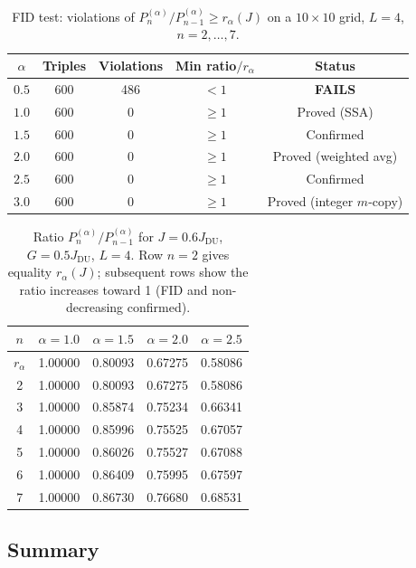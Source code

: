 \documentclass[12pt,a4paper]{article}
\begin{document}
\begin{table}[h!]
\centering
\caption{FID test: violations of $P_n^{(\alpha)}/P_{n-1}^{(\alpha)}\geq r_\alpha(J)$
on a $10\times10$ grid, $L=4$, $n=2,\ldots,7$.}
\label{tab:fid_test}
\begin{tabular}{c|c|c|c|c}
$\alpha$ & Triples & Violations & Min ratio$/r_\alpha$ & Status \\
\hline
$0.5$ & 600 & 486 & $<1$ & \textbf{FAILS} \\
$1.0$ & 600 & 0 & $\geq1$ & Proved (SSA) \\
$1.5$ & 600 & 0 & $\geq1$ & Confirmed \\
$2.0$ & 600 & 0 & $\geq1$ & Proved (weighted avg) \\
$2.5$ & 600 & 0 & $\geq1$ & Confirmed \\
$3.0$ & 600 & 0 & $\geq1$ & Proved (integer $m$-copy) \\
\end{tabular}
\end{table}

\begin{table}[h!]
\centering
\caption{Ratio $P_n^{(\alpha)}/P_{n-1}^{(\alpha)}$ for $J=0.6J_\mathrm{DU}$,
$G=0.5J_\mathrm{DU}$, $L=4$.  Row $n=2$ gives equality $r_\alpha(J)$;
subsequent rows show the ratio increases toward 1 (FID and non-decreasing confirmed).}
\label{tab:fid_ratio}
\begin{tabular}{c|c|c|c|c}
$n$ & $\alpha=1.0$ & $\alpha=1.5$ & $\alpha=2.0$ & $\alpha=2.5$ \\
\hline
$r_\alpha$ & 1.00000 & 0.80093 & 0.67275 & 0.58086 \\
\hline
2 & 1.00000 & 0.80093 & 0.67275 & 0.58086 \\
3 & 1.00000 & 0.85874 & 0.75234 & 0.66341 \\
4 & 1.00000 & 0.85996 & 0.75525 & 0.67057 \\
5 & 1.00000 & 0.86026 & 0.75527 & 0.67088 \\
6 & 1.00000 & 0.86409 & 0.75995 & 0.67597 \\
7 & 1.00000 & 0.86730 & 0.76680 & 0.68531 \\
\end{tabular}
\end{table}

\subsection{Summary}
\label{sec:fid_summary}
\end{document}
